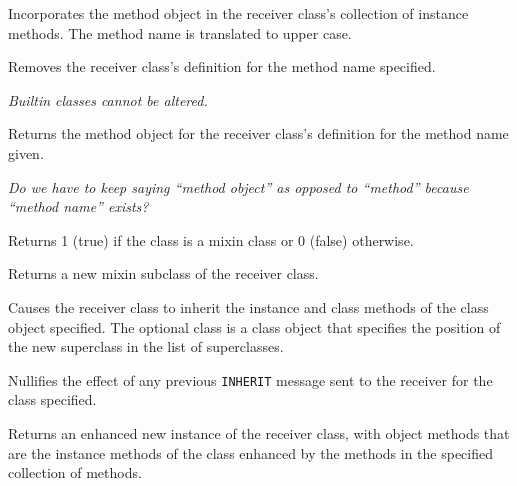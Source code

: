 

Incorporates the method object in the receiver class's collection of
instance methods. The method name is translated to upper case.



Removes the receiver class's definition for the method name specified.

\emph{Builtin classes cannot be altered.}



Returns the method object for the receiver class's definition for the
method name given.

\emph{Do we have to keep saying ``method object'' as opposed to
``method'' because ``method name'' exists?}



Returns 1 (true) if the class is a mixin class or 0 (false) otherwise.



Returns a new mixin subclass of the receiver class.



Causes the receiver class to inherit the instance and class methods of
the class object specified. The optional class is a class object that
specifies the position of the new superclass in the list of
superclasses.



Nullifies the effect of any previous \texttt{INHERIT} message sent to
the receiver for the class specified.



Returns an enhanced new instance of the receiver class, with object
methods that are the instance methods of the class enhanced by the
methods in the specified collection of methods.

